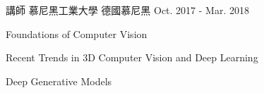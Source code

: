 


\begin{cventries}


\cventry
{講師} %
{慕尼黑工業大學} %
{德國慕尼黑} %
{Oct. 2017 - Mar. 2018} %
{ %
\begin{cvitems}
\item {Foundations of Computer Vision}
\item {Recent Trends in 3D Computer Vision and Deep Learning}
\item {Deep Generative Models}
\end{cvitems}
}


\end{cventries}
